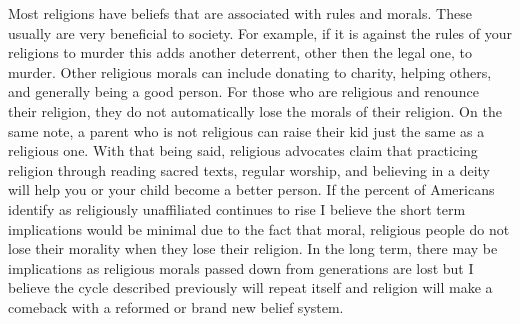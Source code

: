\documentclass{article}
\begin{document}
Most religions have beliefs that are associated with rules and morals. These usually are very beneficial to society. For example, if it is against the rules of your religions to murder this adds another deterrent, other then the legal one, to murder. Other religious morals can include donating to charity, helping others, and generally being a good person. For those who are religious and renounce their religion, they do not automatically lose the morals of their religion. On the same note, a parent who is not religious can raise their kid just the same as a religious one. With that being said, religious advocates claim that practicing religion through reading sacred texts, regular worship, and believing in a deity will help you or your child become a better person. If the percent of Americans identify as religiously unaffiliated continues to rise I believe the short term implications would be minimal due to the fact that moral, religious people do not lose their morality when they lose their religion. In the long term, there may be implications as religious morals passed down from generations are lost but I believe the cycle described previously will repeat itself and religion will make a comeback with a reformed or brand new belief system.
\end{document}
